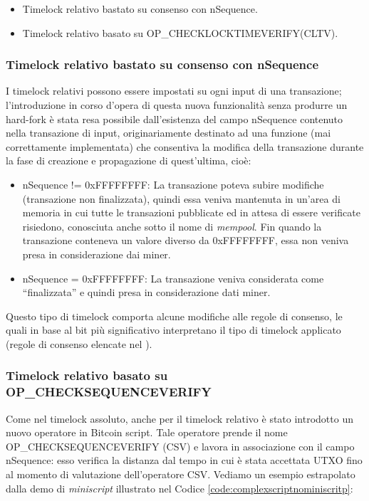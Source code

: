 \begin{itemize}
  \item Timelock relativo bastato su consenso con nSequence.
  \item Timelock relativo basato su OP\_CHECKLOCKTIMEVERIFY(CLTV).
\end{itemize}

\subsubsection{Timelock relativo bastato su consenso con nSequence}
\label{sec:relativetimelock}
I timelock relativi possono essere impostati su ogni input di una transazione; l’introduzione in corso d’opera di questa nuova funzionalità senza produrre un hard-fork è stata resa possibile dall’esistenza del campo nSequence contenuto nella transazione di input, originariamente destinato ad una funzione (mai correttamente implementata) che consentiva la modifica della transazione durante la fase di creazione e propagazione di quest’ultima, cioè:

\begin{itemize}
  \item nSequence != 0xFFFFFFFF: La transazione poteva subire modifiche (transazione non finalizzata), quindi essa veniva mantenuta in un'area di memoria in cui tutte le transazioni pubblicate ed in attesa di essere verificate risiedono, conosciuta anche sotto il nome di {\it mempool\/}. Fin quando la transazione conteneva un valore diverso da 0xFFFFFFFF, essa non veniva presa in considerazione dai miner.
  \item nSequence = 0xFFFFFFFF: La transazione veniva considerata come “finalizzata” e quindi presa in considerazione dati miner.
\end{itemize}

Questo tipo di timelock comporta alcune modifiche alle regole di consenso, le quali in base al bit più significativo interpretano il tipo di timelock applicato (regole di consenso elencate nel \cite{bitcoinbip:bip68}).

\subsubsection{Timelock relativo basato su OP\_CHECKSEQUENCEVERIFY}

Come nel timelock assoluto, anche per il timelock relativo è stato introdotto un nuovo operatore in Bitcoin script.  Tale operatore prende il nome
OP\_CHECK\-SEQUENCE\-VERIFY (CSV) e lavora in associazione con il campo nSequence: esso verifica la distanza dal tempo in cui è stata accettata UTXO  fino al momento di valutazione dell'operatore CSV. Vediamo un esempio estrapolato dalla demo di {\it miniscript \/} illustrato nel Codice \ref{code:complexscriptnominiscritp}:

